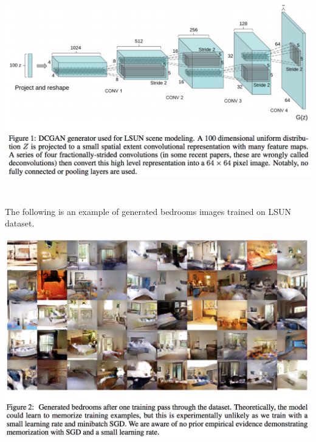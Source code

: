 \documentclass{winnower}
\begin{document}
\begin{center}
\includegraphics[width=16cm, height=9cm]{dcgan.png}
\end{center}

The following is an example of generated bedrooms images trained on LSUN dataset.

\begin{center}
\includegraphics{bedrooms.png}
\end{center}
\end{document}
